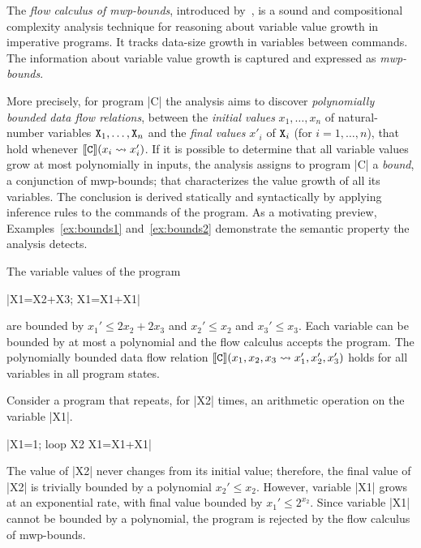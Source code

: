 The \emph{flow calculus of mwp-bounds}, introduced by~\textcite{jones2009},
is a sound and compositional complexity analysis technique
for reasoning about variable value growth in imperative programs.
It tracks data-size growth in variables between commands.
The information about variable value growth is captured and expressed as \emph{mwp-bounds}.

More precisely, for program \pr|C| the analysis aims to discover \emph{polynomially bounded data flow relations},
between the \emph{initial values} \(x_1,\ldots,x_n\) of natural-number variables \(\prm{X}_1,\ldots,\prm{X}_n\) and the \emph{final values} \(x'_i\) of \(\prm{X}_i\) (for \(i=1,\ldots,n\)),
that hold whenever \(\sem{\prm{C}}(x_i \rightsquigarrow x^\prime_i)\).
If it is possible to determine that all variable values grow at most polynomially in inputs, the analysis assigns to program \pr|C| a \emph{bound}, \ie a conjunction of mwp-bounds;
that characterizes the value growth of all its variables.
The conclusion is derived statically and syntactically by applying inference rules to the commands of the program.
As a motivating preview, Examples~\ref{ex:bounds1} and~\ref{ex:bounds2} demonstrate the semantic property the analysis detects.

\begin{example}\label{ex:bounds1}
The variable values of the program
\begin{center}
\pr|X1=X2+X3; X1=X1+X1|
\end{center}
are bounded by \(x_1' \leq 2x_2 + 2x_3\) and \(x_2' \leq x_2\) and \(x_3' \leq x_3\).
Each variable can be bounded by at most a polynomial and the flow calculus accepts the program.
The polynomially bounded data flow relation \(\sem{\prm{C}}(x_1,x_2,x_3 \rightsquigarrow x^\prime_1,x^\prime_2,x^\prime_3)\)
holds for all variables in all program states.
\end{example}

\begin{example}\label{ex:bounds2}
Consider a program that repeats, for \pr|X2| times, an arithmetic operation on the variable \pr|X1|.
\begin{center}
\pr|X1=1; loop X2 {X1=X1+X1}|
\end{center}
The value of \pr|X2| never changes from its initial value;
therefore, the final value of \pr|X2| is trivially bounded by a polynomial \(x_2' \leq x_2\).
However, variable \pr|X1| grows at an exponential rate, with final value bounded by \(x_1' \leq 2^{x_2}\).
Since variable \pr|X1| cannot be bounded by a polynomial, the program is rejected by the flow calculus of mwp-bounds.
\end{example}


